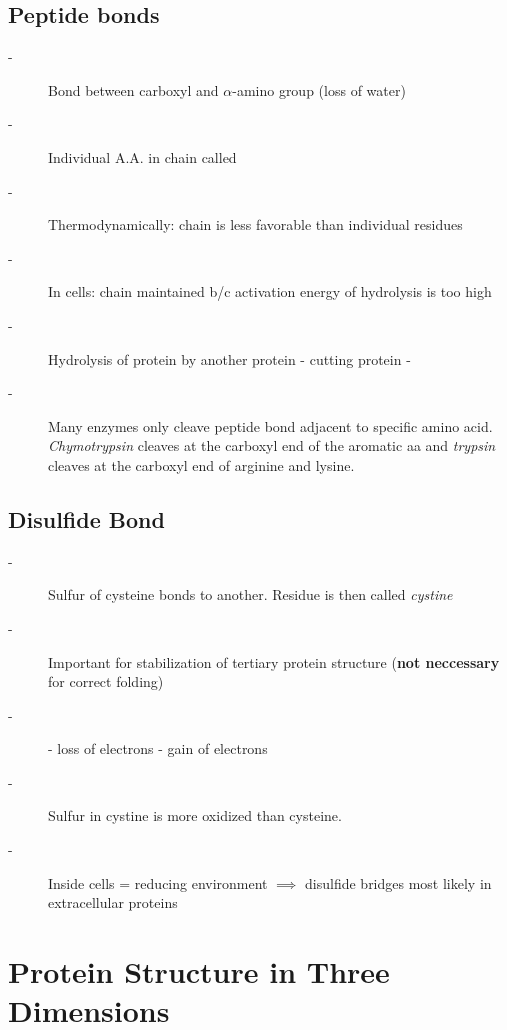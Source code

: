 \documentclass[../Bio_chemistryReview.tex]{subfiles}
\begin{document}
\subsection{Peptide bonds}
\begin{description}
  \item[-] Bond between carboxyl and $\alpha$-amino group (loss of water)
  \item[-] Individual A.A. in chain called 
  \item[-] Thermodynamically: chain is less favorable than individual residues
  \item[-] In cells: chain maintained b/c activation energy of hydrolysis is too
    high
  \item[-] Hydrolysis of protein by another protein -
     cutting protein -
  \item[-] Many enzymes only cleave peptide bond adjacent to specific amino
    acid. \emph{Chymotrypsin} cleaves at the carboxyl end of the aromatic aa and
    \emph{trypsin} cleaves at the carboxyl end of arginine and lysine.
\end{description}

\subsection{Disulfide Bond}
\begin{description}
  \item[-] Sulfur of cysteine bonds to another. Residue is then called
    \textit{cystine} 
  \item[-] Important for stabilization of tertiary protein
    structure (\textbf{not neccessary} for correct folding) 
  \item[-]  - loss of electrons  - gain of
    electrons	
  \item[-] Sulfur in cystine is more oxidized than cysteine.
  \item[-] Inside cells = reducing environment $\implies$ disulfide bridges
    most likely in extracellular proteins
\end{description}

\section{Protein Structure in Three Dimensions}
\end{document}

